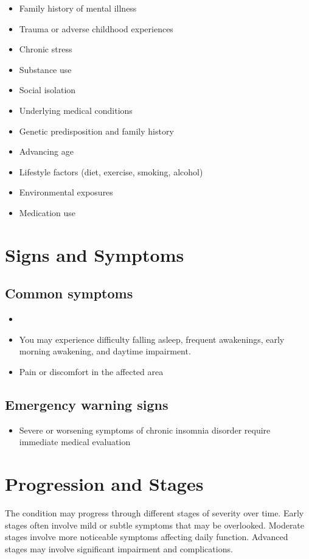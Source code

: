 \begin{itemize}[noitemsep]
  \item Family history of mental illness
  \item Trauma or adverse childhood experiences
  \item Chronic stress
  \item Substance use
  \item Social isolation
  \item Underlying medical conditions
  \item Genetic predisposition and family history
  \item Advancing age
  \item Lifestyle factors (diet, exercise, smoking, alcohol)
  \item Environmental exposures
  \item Medication use
\end{itemize}
\section{Signs and Symptoms}

\subsection{Common symptoms}
\begin{itemize}[noitemsep]
  \item \item You may experience difficulty falling asleep, frequent awakenings, early morning awakening, and daytime impairment.

  \item Pain or discomfort in the affected area
  \end{itemize}

\subsection{Emergency warning signs}
\begin{itemize}[noitemsep]
  \item Severe or worsening symptoms of chronic insomnia disorder require immediate medical evaluation
\end{itemize}
\section{Progression and Stages}
The condition may progress through different stages of severity over time. Early stages often involve mild or subtle symptoms that may be overlooked. Moderate stages involve more noticeable symptoms affecting daily function. Advanced stages may involve significant impairment and complications.
